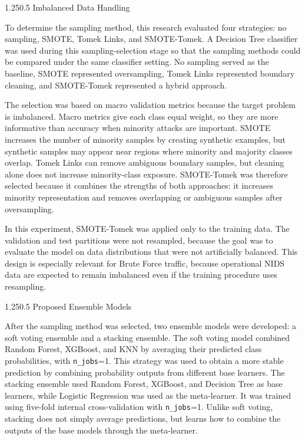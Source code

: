 \documentclass[12pt,a4paper]{article}
\makeatletter
\renewcommand{\subsection}{\@startsection{subsection}{2}{0pt}%
  {1.25\baselineskip}{0.5\baselineskip}%
  {\normalfont\fontsize{13}{15.6}\selectfont\bfseries}}
\makeatother
\begin{document}
\subsection{Imbalanced Data Handling}

To determine the sampling method, this research evaluated four strategies: no sampling, SMOTE, Tomek Links, and SMOTE-Tomek. A Decision Tree classifier was used during this sampling-selection stage so that the sampling methods could be compared under the same classifier setting. No sampling served as the baseline, SMOTE represented oversampling, Tomek Links represented boundary cleaning, and SMOTE-Tomek represented a hybrid approach.

The selection was based on macro validation metrics because the target problem is imbalanced. Macro metrics give each class equal weight, so they are more informative than accuracy when minority attacks are important. SMOTE increases the number of minority samples by creating synthetic examples, but synthetic samples may appear near regions where minority and majority classes overlap. Tomek Links can remove ambiguous boundary samples, but cleaning alone does not increase minority-class exposure. SMOTE-Tomek was therefore selected because it combines the strengths of both approaches: it increases minority representation and removes overlapping or ambiguous samples after oversampling.

In this experiment, SMOTE-Tomek was applied only to the training data. The validation and test partitions were not resampled, because the goal was to evaluate the model on data distributions that were not artificially balanced. This design is especially relevant for Brute Force traffic, because operational NIDS data are expected to remain imbalanced even if the training procedure uses resampling.

\subsection{Proposed Ensemble Models}

After the sampling method was selected, two ensemble models were developed: a soft voting ensemble and a stacking ensemble. The soft voting model combined Random Forest, XGBoost, and KNN by averaging their predicted class probabilities, with \texttt{n\_jobs}=1. This strategy was used to obtain a more stable prediction by combining probability outputs from different base learners. The stacking ensemble used Random Forest, XGBoost, and Decision Tree as base learners, while Logistic Regression was used as the meta-learner. It was trained using five-fold internal cross-validation with \texttt{n\_jobs}=1. Unlike soft voting, stacking does not simply average predictions, but learns how to combine the outputs of the base models through the meta-learner.
\end{document}
